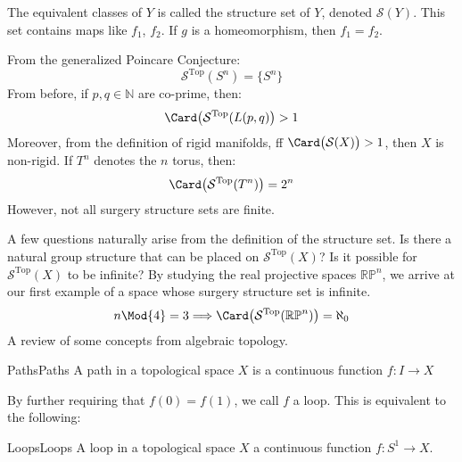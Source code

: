     The equivalent classes of $Y$ is called the
    structure set of $Y$,
    denoted $\mathcal{S}(Y)$. This set contains maps
    like $f_{1}$, $f_{2}$.
    If $g$ is a homeomorphism, then $f_{1}=f_{2}$.
    \begin{lexample}{}{}
        From the generalized Poincare Conjecture:
        \begin{equation}
            \mathcal{S}^{\textrm{Top}}(S^{n})
            =\{S^{n}\}
        \end{equation}
        From before, if $p,q\in\mathbb{N}$ are co-prime, then:
        \begin{equation}
            \Card\big(\mathcal{S}^{\textrm{Top}}(L(p,q)\big)>1
        \end{equation}
        Moreover, from the definition of rigid manifolds,
        ff $\Card\big(\mathcal{S}(X)\big)>1$, then $X$ is non-rigid.
        If $T^{n}$ denotes the $n$ torus, then:
        \begin{equation}
            \Card\big(\mathcal{S}^{\textrm{Top}}(T^{n})\big)
            =2^{n}
        \end{equation}
        However, not all surgery structure sets are finite.
    \end{lexample}
    A few questions naturally arise from the
    definition of the structure set. Is there a natural group
    structure that can be placed on $\mathcal{S}^{\textrm{Top}}(X)$?
    Is it possible for $\mathcal{S}^{\textrm{Top}}(X)$ to be infinite?
    By studying the real projective spaces $\mathbb{RP}^{n}$, we
    arrive at our first example of a space whose surgery structure
    set is infinite.
    \begin{equation}
        n\Mod{4}=3
        \Longrightarrow
        \Card\big(\mathcal{S}^{\textrm{Top}}(\mathbb{RP}^{n})\big)
        =\aleph_{0}
    \end{equation}
    A review of some concepts from algebraic topology.
    \begin{ldefinition}{Paths}{Paths}
        A path in a topological space $X$ is a
        continuous function $f:I\rightarrow{X}$
    \end{ldefinition}
    By further requiring that $f(0)=f(1)$, we call $f$ a loop. This is
    equivalent to the following:
    \begin{ldefinition}{Loops}{Loops}
        A loop in a topological space $X$ a continuous function
        $f:S^{1}\rightarrow{X}$.
    \end{ldefinition}
